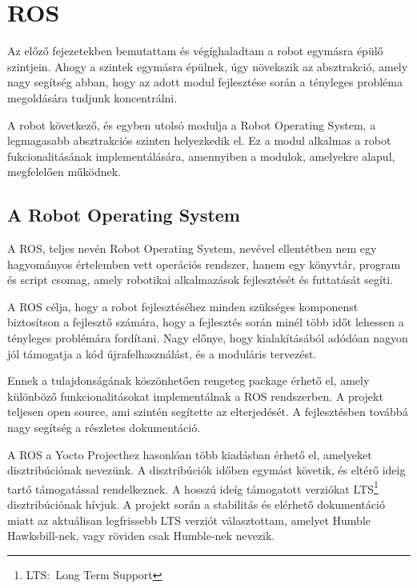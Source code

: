 \chapter{ROS}

Az előző fejezetekben bemutattam és végíghaladtam a robot egymásra épülő
szintjein. Ahogy a szintek egymásra épülnek, úgy növekszik az absztrakció, amely
nagy segítség abban, hogy az adott modul fejlesztése során a tényleges probléma
megoldására tudjunk koncentrálni.

A robot következő, és egyben utolsó modulja a Robot Operating System, a
legmagasabb absztrakciós szinten helyezkedik el. Ez a modul alkalmas a robot
fukcionalitásának implementálására, amennyiben a modulok, amelyekre alapul,
megfelelően működnek.

\section{A Robot Operating System}

A ROS, teljes nevén Robot Operating System, nevével ellentétben nem egy
hagyományos értelemben vett operációs rendszer, hanem egy könyvtár, program és
script csomag, amely robotikai alkalmazások fejlesztését és futtatását segíti.

A ROS célja, hogy a robot fejlesztéséhez minden szükséges komponenst biztosítson
a fejlesztő számára, hogy a fejlesztés során minél több időt lehessen a tényleges
problémára fordítani. Nagy előnye, hogy kialakításából adódóan nagyon jól
támogatja a kód újrafelhasználást, és a moduláris tervezést.

Ennek a tulajdonságának köszönhetően rengeteg package érhető el, amely különböző
funkcionalitásokat implementálnak a ROS rendszerben. A projekt teljesen open
source, ami szintén segítette az elterjedését. A fejlesztésben továbbá nagy
segítség a részletes dokumentáció.

\medskip

A ROS a Yocto Projecthez hasonlóan több kiadásban érhető el, amelyeket
disztribúciónak nevezünk. A disztribúciók időben egymást követik, és eltérő ideig
tartó támogatással rendelkeznek. A hosszú ideíg támogatott verziókat
LTS\footnote{LTS:~Long Term Support} disztribúciónak hívjuk. A projekt során a
stabilitás és elérhető dokumentáció miatt az aktuálisan legfrissebb LTS verziót
választottam, amelyet Humble Hawksbill-nek, vagy röviden csak
Humble-nek nevezik.

